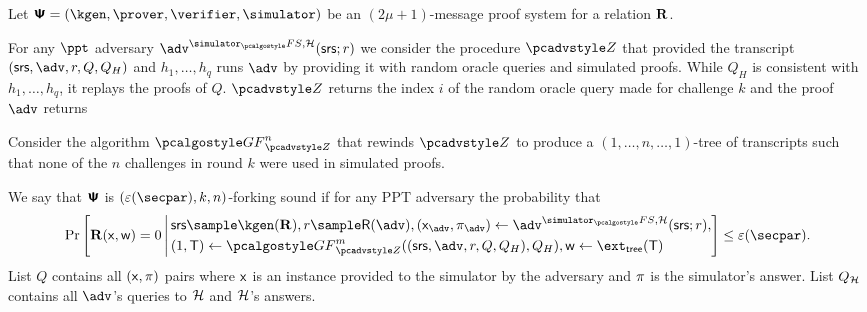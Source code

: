 \documentclass[runningheads,11pt]{llncs}
\begin{document}
\begin{definition}
  Let $\proofsystem = (\kgen, \prover, \verifier, \simulator)$ be an
  $(2 \mu + 1)$-message proof system for a relation $\mathbf{R}$.

For any $\ppt$ adversary $\advse^{\simulator_\fs,
  \ro} (\srs; r)$ we consider the procedure $\zdv$ that provided the transcript $(\srs, \adv, r, Q, Q_{H})$ and $h_1, \ldots, h_q$ runs $\adv$ by providing it with random oracle queries
and simulated proofs. While $Q_{H}$ is consistent with $h_1, \ldots, h_q$, it replays the proofs of $Q$.
%
$\zdv$ returns the index $i$ of the
  random oracle query made for challenge $k$ and the proof $\adv$ returns

  Consider the algorithm $\genforking_{\zdv}^{n}$
  that rewinds $\zdv$ to produce a $(1,\dots, n,\dots, 1)$-tree of
  transcripts such that none of the $n$ challenges in round $k$ were used in
  simulated proofs.

  We say that $\bm{\mathsf{\Psi}}$ is $(\eps(\secpar), k,n)$-forking sound if
  for any PPT adversary the probability that
  \begin{align*}
    \Pr\left[
    \REL(\inp, \wit) = 0
    \,\Biggl|\,
    \begin{aligned}
       & \srs \sample \kgen(\REL),
        r \sample \RND{\advse},
         (\inp_{\advse}, \zkproof_{\advse}) \gets \advse^{\simulator_\fs,\ro} (\srs; r), \\
       &    (1, \tree) \gets \genforking_{\zdv}^{m}((\srs,\adv,r,Q, Q_{H}),Q_{H}),
           \wit \gets \extt(\tree)
    \end{aligned}
    \right] \leq \eps(\secpar).
  \end{align*}
   List $Q$ contains all $(\mathsf{x}, \pi)$ pairs where
  $\mathsf{x}$ is an instance provided to the simulator by the adversary and
  $\pi$ is the simulator's answer. List $Q_{\mathcal{H}}$ contains all $\advse$'s
  queries to $\mathcal{H}$ and $\mathcal{H}$'s answers.
\end{definition}
\end{document}
